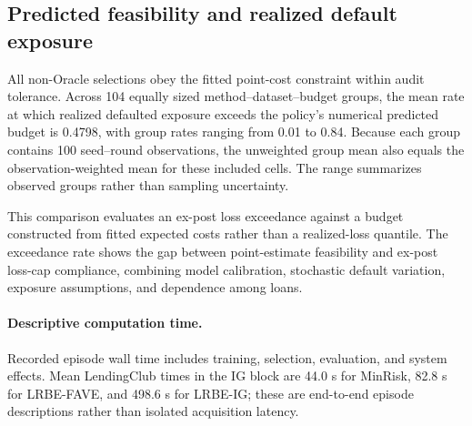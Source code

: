 \subsection{Predicted feasibility and realized default exposure}
All non-Oracle selections obey the fitted point-cost constraint within audit tolerance. Across 104 equally sized method--dataset--budget groups, the mean rate at which realized defaulted exposure exceeds the policy's numerical predicted budget is 0.4798, with group rates ranging from 0.01 to 0.84. Because each group contains 100 seed--round observations, the unweighted group mean also equals the observation-weighted mean for these included cells. The range summarizes observed groups rather than sampling uncertainty.

This comparison evaluates an ex-post loss exceedance against a budget constructed from fitted expected costs rather than a realized-loss quantile. The exceedance rate shows the gap between point-estimate feasibility and ex-post loss-cap compliance, combining model calibration, stochastic default variation, exposure assumptions, and dependence among loans.

\paragraph{Descriptive computation time.}
Recorded episode wall time includes training, selection, evaluation, and system effects. Mean LendingClub times in the IG block are 44.0 s for MinRisk, 82.8 s for LRBE-FAVE, and 498.6 s for LRBE-IG; these are end-to-end episode descriptions rather than isolated acquisition latency.
